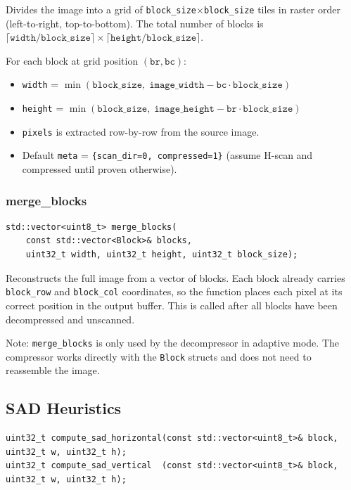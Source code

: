 Divides the image into a grid of \texttt{block\_size}$\times$\texttt{block\_size}
tiles in raster order (left-to-right, top-to-bottom).
The total number of blocks is
$\lceil \mathtt{width} / \mathtt{block\_size} \rceil \times
 \lceil \mathtt{height} / \mathtt{block\_size} \rceil$.

For each block at grid position $(\mathtt{br}, \mathtt{bc})$:
\begin{itemize}
  \item \texttt{width} = $\min(\mathtt{block\_size},\; \mathtt{image\_width} - \mathtt{bc} \cdot \mathtt{block\_size})$
  \item \texttt{height} = $\min(\mathtt{block\_size},\; \mathtt{image\_height} - \mathtt{br} \cdot \mathtt{block\_size})$
  \item \texttt{pixels} is extracted row-by-row from the source image.
  \item Default \texttt{meta} = \texttt{\{scan\_dir=0, compressed=1\}} (assume H-scan and compressed until proven otherwise).
\end{itemize}

\subsubsection{merge\_blocks}

\begin{lstlisting}[style=cpp]
std::vector<uint8_t> merge_blocks(
    const std::vector<Block>& blocks,
    uint32_t width, uint32_t height, uint32_t block_size);
\end{lstlisting}

Reconstructs the full image from a vector of blocks.
Each block already carries \texttt{block\_row} and \texttt{block\_col} coordinates,
so the function places each pixel at its correct position in the output buffer.
This is called after all blocks have been decompressed and unscanned.

Note: \texttt{merge\_blocks} is only used by the decompressor in adaptive mode.
The compressor works directly with the \texttt{Block} structs and does not need
to reassemble the image.

\subsection{SAD Heuristics}

\begin{lstlisting}[style=cpp]
uint32_t compute_sad_horizontal(const std::vector<uint8_t>& block, uint32_t w, uint32_t h);
uint32_t compute_sad_vertical  (const std::vector<uint8_t>& block, uint32_t w, uint32_t h);
\end{lstlisting}

